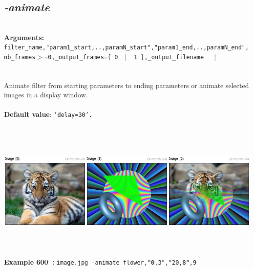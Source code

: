 \documentclass[a4paper,11pt,twoside]{book}
\begin{document}
\subsection{\emph{-animate} }\vspace*{-0.5em}
~\\\textbf{Arguments: } 
{\small \texttt{filter\_name,"param1\_start,..,paramN\_start","param1\_end,..,paramN\_end",nb\_frames$>$=0,\_output\_frames=\{ 0 ~$|$~ 1 \},\_output\_filename}}~~~$|$\\
\\~\\
Animate filter from starting parameters to ending parameters or animate selected images
in a display window.
~\\~\\\textbf{Default value}: {\small \texttt{'delay=30'.}}
\begin{center}\includegraphics[keepaspectratio=true,height=7cm,width=\textwidth]{img/gmic_def600.jpg}\\
{\footnotesize \textbf{Example 600~:} \texttt{image.jpg -animate flower,"0,3","20,8",9}}
\end{center}
\end{document}
